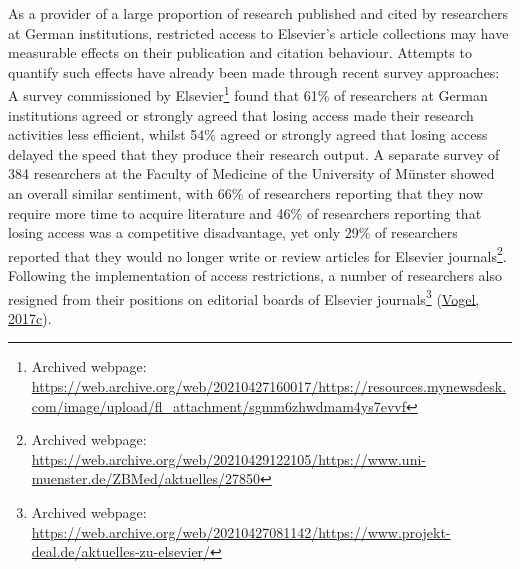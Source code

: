 \documentclass[
]{article}
\begin{document}
As a provider of a large proportion of research published and cited by researchers at German institutions,  restricted access to Elsevier's article collections may have measurable effects on their publication and citation behaviour. Attempts to quantify such effects have already been made through recent survey approaches: A survey commissioned by Elsevier\footnote{Archived webpage: \url{https://web.archive.org/web/20210427160017/https://resources.mynewsdesk.com/image/upload/fl_attachment/sgmm6zhwdmam4ys7evvf}} found that 61\% of researchers at German institutions agreed or strongly agreed that losing access made their research activities less efficient, whilst 54\% agreed or strongly agreed that losing access delayed the speed that they produce their research output. A separate survey of 384 researchers at the Faculty of Medicine of the University of Münster showed an overall similar sentiment, with 66\% of researchers reporting that they now require more time to acquire literature and 46\% of researchers reporting that losing access was a competitive disadvantage, yet only 29\% of researchers reported that they would no longer write or review articles for Elsevier journals\footnote{Archived webpage: \url{https://web.archive.org/web/20210429122105/https://www.uni-muenster.de/ZBMed/aktuelles/27850}}. Following the implementation of access restrictions, a number of researchers also resigned from their positions on editorial boards of Elsevier journals\footnote{Archived webpage: \url{https://web.archive.org/web/20210427081142/https://www.projekt-deal.de/aktuelles-zu-elsevier/}} (\href{https://doi.org/10.1126/science.aar2142}{Vogel, 2017c}).
\end{document}
